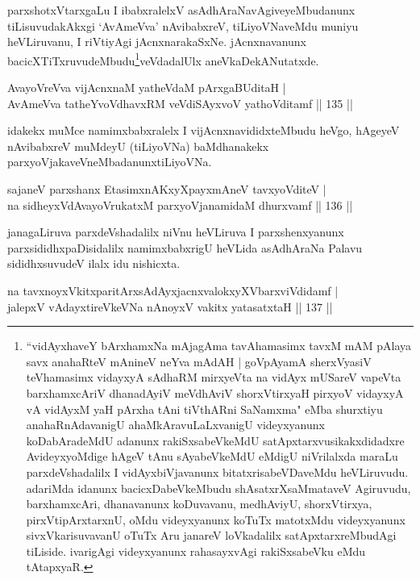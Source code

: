 \begin{artha}
parxshotxVtarxgaLu I ibabxralelxV asAdhAraNavAgiveyeMbudanunx tiLisuvudakAkxgi `AvAmeVva' nAvibabxreV, tiLiyoVNaveMdu muniyu heVLiruvanu, I riVtiyAgi jAcnxnarakaSxNe. jAcnxnavanunx bacicXTiTxruvudeMbudu\footnote{``vidAyxhaveY bArxhamxNa mAjagAma tavAhamasimx tavxM mAM pAlaya savx anahaRteV mAnineV neYva mAdAH | goVpAyamA sherxVyasiV teVhamasimx vidayxyA sAdhaRM mirxyeVta na vidAyx mUSareV vapeVta barxhamxcAriV dhanadAyiV meVdhAviV shorxVtirxyaH pirxyoV vidayxyA vA vidAyxM yaH pArxha tAni tiVthARni SaNamxma" eMba shurxtiyu anahaRnAdavanigU ahaMkAravuLaLxvanigU videyxyanunx koDabAradeMdU adanunx rakiSxsabeVkeMdU satApxtarxvusikakxdidadxre AvideyxyoMdige hAgeV tAnu sAyabeVkeMdU eMdigU niVrilalxda maraLu parxdeVshadalilx I vidAyxbiVjavanunx bitatxrisabeVDaveMdu heVLiruvudu. adariMda idanunx bacicxDabeVkeMbudu shAsatxrXsaMmataveV Agiruvudu, barxhamxcAri, dhanavanunx koDuvavanu, medhAviyU, shorxVtirxya, pirxVtipArxtarxnU, oMdu videyxyanunx koTuTx matotxMdu videyxyanunx sivxVkarisuvavanU oTuTx Aru janareV loVkadalilx satApxtarxreMbudAgi tiLiside. ivarigAgi videyxyanunx rahasayxvAgi rakiSxsabeVku eMdu tAtapxyaR.}veVdadalUlx aneVkaDe\break kANutatxde.
\end{artha}

\begin{shl}
AvayoVreVva vijAcnxnaM yatheVdaM pArxgaBUditaH |\\
AvAmeVva tatheYvoVdhavxRM veVdiSAyxvoV yathoVditamf \hfill || 135 ||
\end{shl}

\begin{artha}
idakekx muMce namimxbabxralelx I vijAcnxnavididxteMbudu heVgo, hAgeyeV nAvibabxreV muMdeyU (tiLiyoVNa) baMdhanakekx parxyoVjakaveVneMbadanunx\break tiLiyoVNa.
\end{artha}

\begin{shl}
sajaneV parxshanx EtasimxnAKxyXpayxmAneV tavxyoVditeV |\\
na sidheyxVdAvayoVrukatxM parxyoVjanamidaM dhurxvamf \hfill || 136 ||
\end{shl}

\begin{artha}
janagaLiruva parxdeVshadalilx niVnu heVLiruva I parxshenxyanunx parxsididhxpaDisidalilx namimxbabxrigU heVLida asAdhAraNa Palavu sididhxsuvudeV ilalx idu nishicxta.
\end{artha}

\begin{shl}
na tavxnoyxVkitxparitArxsAdAyxjacnxvalokxyXV\s barxviVdidamf |\\
jalepxV vAdayxtireVkeVNa nAnoyxV vakitx yatasatxtaH \hfill || 137 ||
\end{shl}

